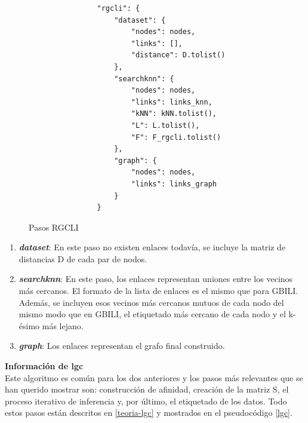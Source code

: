 \begin{figure}[h!]
    \centering
    \begin{minipage}{0.9\linewidth}
        \begin{center}
            \begin{lstlisting}
                "rgcli": {
                    "dataset": {
                        "nodes": nodes,
                        "links": [],
                        "distance": D.tolist()
                    },
                    "searchknn": {
                        "nodes": nodes,
                        "links": links_knn,
                        "kNN": kNN.tolist(),
                        "L": L.tolist(),
                        "F": F_rgcli.tolist()
                    },
                    "graph": {
                        "nodes": nodes,
                        "links": links_graph
                    }
                }
            \end{lstlisting}
        \end{center}
    \end{minipage}
    \caption{Pasos RGCLI}
    \label{fig:pasos-rgcli}
\end{figure}

\begin{enumerate}
    \item \textit{\textbf{dataset}}: En este paso no existen enlaces todavía, se incluye la matriz de distancias D de cada par de nodos.
    \item \textit{\textbf{searchknn}}: En este paso, los enlaces representan uniones entre los vecinos más cercanos. El formato de la lista de enlaces es el mismo que para GBILI. Además, se incluyen esos vecinos más cercanos mutuos de cada nodo del mismo modo que en GBILI, el etiquetado más cercano de cada nodo y el k-ésimo más lejano.
     \item \textit{\textbf{graph}}: Los enlaces representan el grafo final construido.
\end{enumerate}

\noindent\textbf{\large Información de \Gls{lgc}} \\
Este algoritmo es común para los dos anteriores y los pasos más relevantes que se han querido mostrar son: construcción de afinidad, creación de la matriz S, el proceso iterativo de inferencia y, por último, el etiquetado de los datos. Todo estos pasos están descritos en \ref{teoria-lgc} y mostrados en el pseudocódigo \ref{lgc}.


